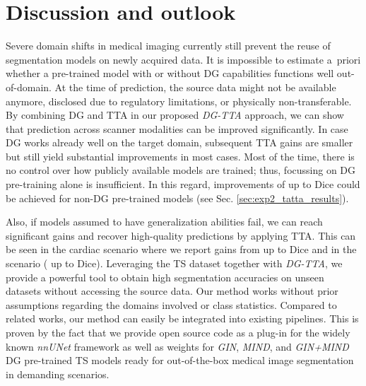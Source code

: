 \section{Discussion and outlook}
    Severe domain shifts in medical imaging currently still prevent the reuse of segmentation models on newly acquired data. It is impossible to estimate \mbox{a priori} whether a pre-trained model with or without DG capabilities functions well out-of-domain. At the time of prediction, the source data might not be available anymore, disclosed due to regulatory limitations, or physically non-transferable. By combining DG and TTA in our proposed \emph{DG-TTA} approach, we can show that prediction across scanner modalities can be improved significantly.
    In case DG works already well on the target domain, subsequent TTA gains are smaller but still yield substantial improvements in most cases. Most of the time, there is no control over how publicly available models are trained; thus, focussing on DG pre-training alone is insufficient. In this regard, improvements of up to  Dice could be achieved for non-DG pre-trained models (see Sec. \ref{sec:exp2_tatta_results}).

    Also, if models assumed to have generalization abilities fail, we can reach significant gains and recover high-quality predictions by applying TTA. This can be seen in the cardiac  scenario where we report gains from  up to  Dice and in the  scenario ( up to  Dice).
    Leveraging the TS dataset \cite{wasserthal2023totalsegmentator} together with \emph{DG-TTA}, we provide a powerful tool to obtain high segmentation accuracies on unseen datasets without accessing the source data.
    Our method works without prior assumptions regarding the domains involved or class statistics. Compared to related works, our method can easily be integrated into existing pipelines. This is proven by the fact that we provide open source code as a plug-in for the widely known \emph{nnUNet} framework as well as weights for \emph{GIN}, \emph{MIND}, and \emph{GIN+MIND} DG pre-trained TS models ready for out-of-the-box medical image segmentation in demanding scenarios.